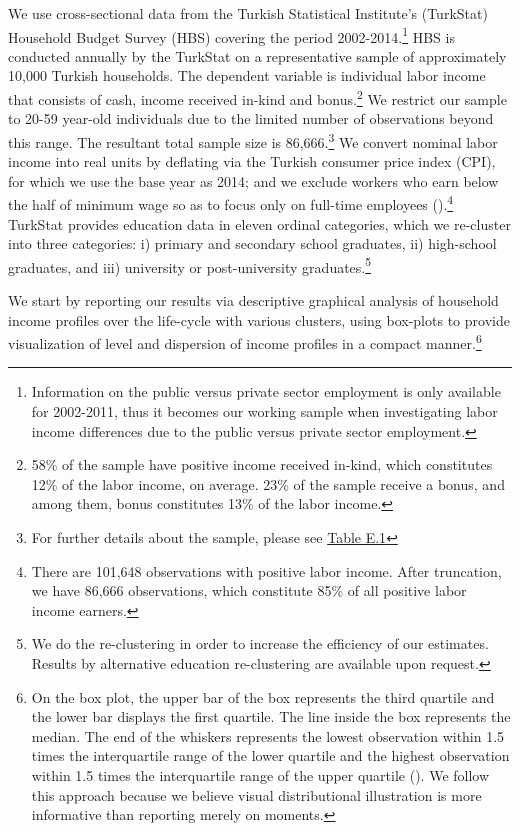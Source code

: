 \documentclass[12pt,author-year]{article}
\begin{document}
We use cross-sectional data from the Turkish Statistical Institute's (TurkStat) Household Budget Survey (HBS) covering the period 2002-2014.\footnote{Information on the public versus private sector employment is only available for 2002-2011, thus it becomes our working sample when investigating labor income differences due to the public versus private sector employment.} HBS  is conducted annually by the TurkStat on a representative sample of approximately 10,000 Turkish households. The dependent variable is individual labor income that consists of cash, income received in-kind and bonus.\footnote{58\% of the sample have positive income received in-kind, which constitutes 12\% of the labor income, on average. 23\% of the sample receive a bonus, and among them, bonus constitutes 13\% of the labor income.} We restrict our sample to 20-59 year-old individuals due to the limited number of observations beyond this range. The resultant total sample size is 86,666.\footnote{For further details about the sample, please see \hyperref[tablee1]{Table E.1}} We convert nominal labor income into real units by deflating via the Turkish consumer price index (CPI), for which we use the base year as 2014; and we exclude workers who earn below the half of minimum wage so as to focus only on full-time employees (\citealp{Krueger}).\footnote{There are 101,648 observations with positive labor income. After truncation, we have 86,666 observations, which constitute 85\% of all positive labor income earners.} TurkStat provides education data in eleven ordinal categories, which we re-cluster into three categories: i) primary and secondary school graduates, ii) high-school graduates, and iii) university or post-university graduates.\footnote{We do the re-clustering in order to increase the efficiency of our estimates. Results by alternative education re-clustering are available upon request.}  

We start by reporting our results via descriptive graphical analysis of household income profiles over the life-cycle with various clusters, using box-plots to provide visualization of level and dispersion of income profiles in a compact manner.\footnote{On the box plot, the upper bar of the box represents the third quartile and the lower bar displays the first quartile. The line inside the box represents the median. The end of the whiskers represents the lowest observation within 1.5 times the interquartile range of the lower quartile and the highest observation within 1.5 times the interquartile range of the upper quartile (\citealp{Tukey}). We follow this approach because we believe visual distributional illustration is more informative than reporting merely on moments.}
\end{document}
